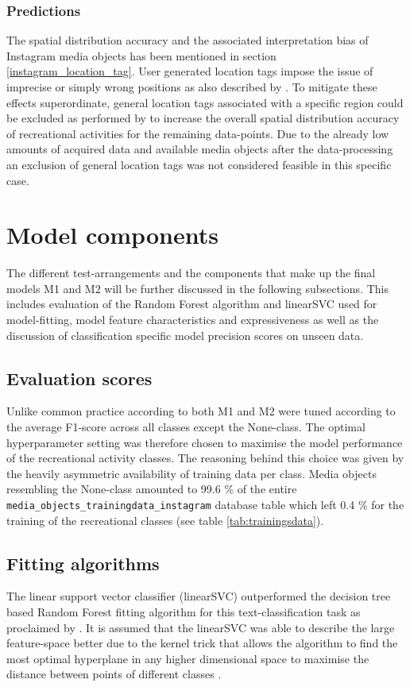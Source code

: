 \subsubsection{Predictions}
The spatial distribution accuracy and the associated interpretation bias of Instagram media objects has been mentioned in section \ref{instagram_location_tag}. User generated location tags impose the issue of imprecise or simply wrong positions as also described by \textcite{Lee2016}. To mitigate these effects superordinate, general location tags associated with a specific region could be excluded as performed by \textcite{Heikinheimo2017} to increase the overall spatial distribution accuracy of recreational activities for the remaining data-points. Due to the already low amounts of acquired data and available media objects after the data-processing an exclusion of general location tags was not considered feasible in this specific case.  

\section{Model components} \label{disussion_model_performance}
The different test-arrangements and the components that make up the final models M1 and M2 will be further discussed in the following subsections. This includes evaluation of the Random Forest algorithm and linearSVC used for model-fitting, model feature characteristics and expressiveness as well as the discussion of classification specific model precision scores on unseen data.

\subsection{Evaluation scores}
Unlike common practice according to \textcite{Guido2016} both M1 and M2 were tuned according to the average F1-score across all classes except the None-class. The optimal hyperparameter setting was therefore chosen to maximise the model performance of the recreational activity classes. The reasoning behind this choice was given by the heavily asymmetric availability of training data per class. Media objects resembling the None-class amounted to 99.6 \% of the entire \texttt{media\_objects\_trainingdata\_instagram} database table which left 0.4 \% for the training of the recreational classes (see table \ref{tab:trainingsdata}).

\subsection{Fitting algorithms}
The linear support vector classifier (linearSVC) outperformed the decision tree based Random Forest fitting algorithm for this text-classification task as proclaimed by \parencite{Guido2016}. It is assumed that the linearSVC was able to describe the large feature-space better due to the kernel trick that allows the algorithm to find the most optimal hyperplane in any higher dimensional space to maximise the distance between points of different classes \parencite{Shawe-Taylor2004}.

